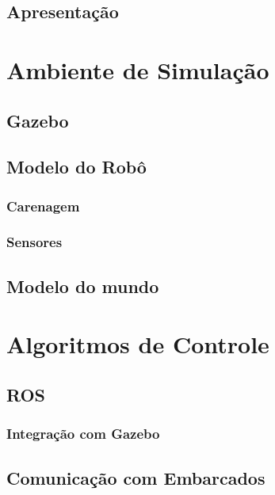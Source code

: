 \documentclass[]{politex}
\begin{document}
\section{Apresentação}

\chapter{Ambiente de Simulação}
\section{Gazebo}
\section{Modelo do Robô}
\subsection{Carenagem}
\subsection{Sensores}
\section{Modelo do mundo}
\chapter{Algoritmos de Controle}
\section{ROS}
\subsection{Integração com Gazebo}
\section{Comunicação com Embarcados}

\blindtext

\begin{citacaoLonga}
	\blindtext
\end{citacaoLonga}

\blindtext




%
\end{document}
